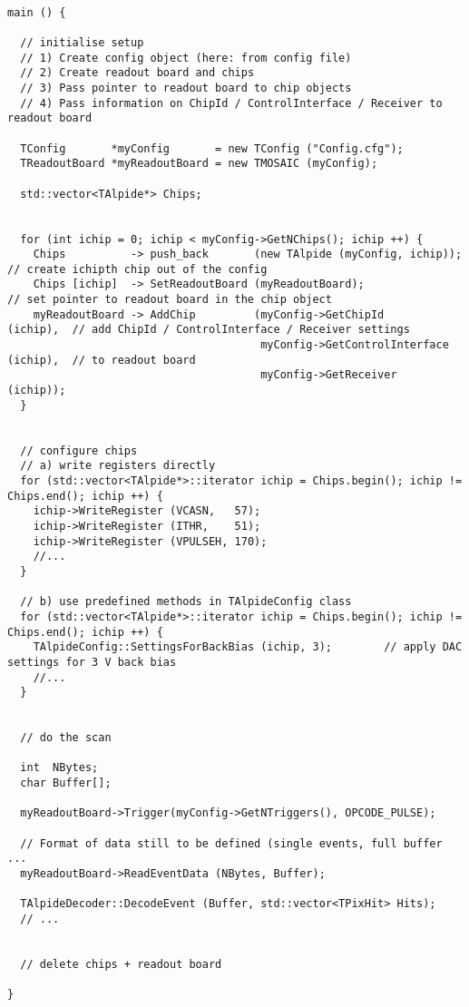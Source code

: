 \documentclass{article}
\begin{document}
\begin{Verbatim}[fontsize=\tiny]

main () {

  // initialise setup
  // 1) Create config object (here: from config file)
  // 2) Create readout board and chips
  // 3) Pass pointer to readout board to chip objects
  // 4) Pass information on ChipId / ControlInterface / Receiver to readout board

  TConfig       *myConfig       = new TConfig ("Config.cfg"); 
  TReadoutBoard *myReadoutBoard = new TMOSAIC (myConfig);

  std::vector<TAlpide*> Chips;


  for (int ichip = 0; ichip < myConfig->GetNChips(); ichip ++) {
    Chips          -> push_back       (new TAlpide (myConfig, ichip));         // create ichipth chip out of the config
    Chips [ichip]  -> SetReadoutBoard (myReadoutBoard);                        // set pointer to readout board in the chip object
    myReadoutBoard -> AddChip         (myConfig->GetChipId           (ichip),  // add ChipId / ControlInterface / Receiver settings 
                                       myConfig->GetControlInterface (ichip),  // to readout board
                                       myConfig->GetReceiver         (ichip));
  }


  // configure chips
  // a) write registers directly
  for (std::vector<TAlpide*>::iterator ichip = Chips.begin(); ichip != Chips.end(); ichip ++) {
    ichip->WriteRegister (VCASN,   57);
    ichip->WriteRegister (ITHR,    51);
    ichip->WriteRegister (VPULSEH, 170);
    //...
  }

  // b) use predefined methods in TAlpideConfig class
  for (std::vector<TAlpide*>::iterator ichip = Chips.begin(); ichip != Chips.end(); ichip ++) {
    TAlpideConfig::SettingsForBackBias (ichip, 3);        // apply DAC settings for 3 V back bias
    //...
  }

		
  // do the scan

  int  NBytes;
  char Buffer[];			 

  myReadoutBoard->Trigger(myConfig->GetNTriggers(), OPCODE_PULSE);

  // Format of data still to be defined (single events, full buffer ... 
  myReadoutBoard->ReadEventData (NBytes, Buffer);
  
  TAlpideDecoder::DecodeEvent (Buffer, std::vector<TPixHit> Hits);
  // ...
     

  // delete chips + readout board

}


\end{Verbatim}
\end{document}
